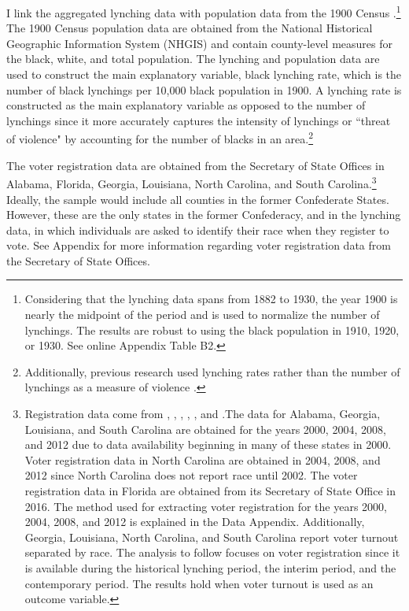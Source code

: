 \documentclass[AEJ, finalmode]{AEA}
\begin{document}
I link the aggregated lynching data with population data from the 1900 Census \cite{ipumsnhgis}.\footnote{Considering that the lynching data spans from 1882 to 1930, the year 1900 is nearly the midpoint of the period and is used to normalize the number of lynchings. The results are robust to using the black population in 1910, 1920, or 1930. See online Appendix Table B2.} The 1900 Census population data are obtained from the National Historical Geographic Information System (NHGIS) and contain county-level measures for the black, white, and total population. The lynching and population data are used to construct the main explanatory variable, black lynching rate, which is the number of black lynchings per 10,000 black population in 1900. A lynching rate is constructed as the main explanatory variable as opposed to the number of lynchings since it more accurately captures the intensity of lynchings or ``threat of violence" by accounting for the number of blacks in an area.\footnote{Additionally, previous research used lynching rates rather than the number of lynchings as a measure of violence \cite{cook2014violence,acharya2016political}. }

The voter registration data are obtained from the Secretary of State Offices in Alabama, Florida, Georgia, Louisiana, North Carolina, and South Carolina.\footnote{Registration data come from , , , , , and .The data for Alabama, Georgia, Louisiana, and South Carolina are obtained for the years 2000, 2004, 2008, and 2012 due to data availability beginning in many of these states in 2000. Voter registration data in North Carolina are obtained in 2004, 2008, and 2012 since North Carolina does not report race until 2002. The voter registration data in Florida are obtained from its Secretary of State Office in 2016. The method used for extracting voter registration for the years 2000, 2004, 2008, and 2012 is explained in the Data Appendix. Additionally, Georgia, Louisiana, North Carolina, and South Carolina report voter turnout separated by race. The analysis to follow focuses on voter registration since it is available during the historical lynching period, the interim period, and the contemporary period. The results hold when voter turnout is used as an outcome variable.} Ideally, the sample would include all counties in the former Confederate States. However, these are the only states in the former Confederacy, and in the lynching data, in which individuals are asked to identify their race when they register to vote. See Appendix for more information regarding voter registration data from the Secretary of State Offices. 
\end{document}
